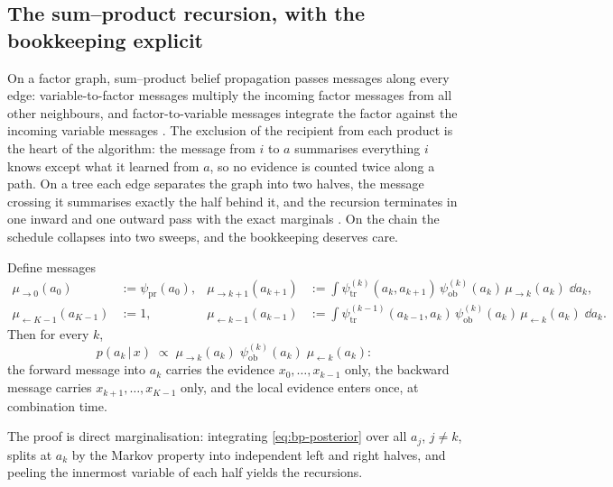 \subsection{The sum--product recursion, with the bookkeeping explicit}

On a factor graph, sum--product belief propagation passes messages along
every edge: variable-to-factor messages multiply the incoming factor
messages from all other neighbours, and factor-to-variable messages
integrate the factor against the incoming variable messages
\citep{pearl1988probabilistic, kschischang2001factor,
mezard2009information}. The exclusion of the recipient from each product
is the heart of the algorithm: the message from $i$ to $a$ summarises
everything $i$ knows except what it learned from $a$, so no evidence is
counted twice along a path. On a tree each edge separates the graph into
two halves, the message crossing it summarises exactly the half behind it,
and the recursion terminates in one inward and one outward pass with the
exact marginals \citep[Thm.~14.1]{mezard2009information}. On the chain the
schedule collapses into two sweeps, and the bookkeeping deserves care.

\begin{proposition}\label{prop:bp-convA}
Define messages
\begin{align}
  \mu_{\to 0}(a_0) &:= \psi_{\mathrm{pr}}(a_0),
  &
  \mu_{\to k+1}(a_{k+1}) &:= \int
    \psi^{(k)}_{\mathrm{tr}}(a_k, a_{k+1})\,
    \psi^{(k)}_{\mathrm{ob}}(a_k)\,
    \mu_{\to k}(a_k)\; \dd a_k ,
  \label{eq:bp-fwd}\\
  \mu_{\leftarrow K-1}(a_{K-1}) &:= 1,
  &
  \mu_{\leftarrow k-1}(a_{k-1}) &:= \int
    \psi^{(k-1)}_{\mathrm{tr}}(a_{k-1}, a_k)\,
    \psi^{(k)}_{\mathrm{ob}}(a_k)\,
    \mu_{\leftarrow k}(a_k)\; \dd a_k .
  \label{eq:bp-bwd}
\end{align}
Then for every $k$,
\begin{equation}
  p(a_k \,|\, x) \;\propto\;
  \mu_{\to k}(a_k)\;
  \psi^{(k)}_{\mathrm{ob}}(a_k)\;
  \mu_{\leftarrow k}(a_k) :
  \label{eq:bp-combine}
\end{equation}
the forward message into $a_k$ carries the evidence
$x_0, \dots, x_{k-1}$ only, the backward message carries
$x_{k+1}, \dots, x_{K-1}$ only, and the local evidence enters once, at
combination time.
\end{proposition}

The proof is direct marginalisation: integrating \eqref{eq:bp-posterior}
over all $a_j$, $j \neq k$, splits at $a_k$ by the Markov property into
independent left and right halves, and peeling the innermost variable of
each half yields the recursions.

